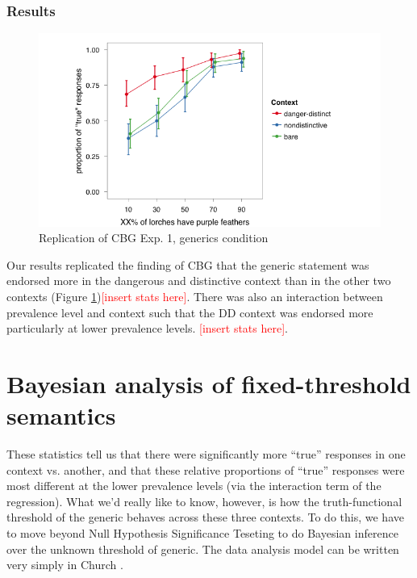 \documentclass[10pt,letterpaper]{article}
\newcommand{\red}[1]{\textcolor{Red}{#1}}
\begin{document}
\subsubsection{Results}

\begin{figure}
\centering
    \includegraphics[width=\columnwidth]{fig1_replication}
    \caption{Replication of CBG Exp. 1, generics condition}
  \label{fig:replication}
\end{figure}


Our results replicated the finding of CBG that the generic statement was endorsed more in the dangerous and distinctive context than in the other two contexts (Figure \ref{fig:replication})\red{[insert stats here]}. There was also an interaction between prevalence level and context such that the DD context was endorsed more particularly at lower prevalence levels. \red{[insert stats here]}. 

\section{Bayesian analysis of fixed-threshold semantics}

These statistics tell us that there were significantly more ``true'' responses in one context vs. another, and that these relative proportions of ``true'' responses were most different at the lower prevalence levels (via the interaction term of the regression). What we'd really like to know, however, is how the truth-functional threshold of the generic behaves across these three contexts. To do this, we have to move beyond Null Hypothesis Significance Teseting to do Bayesian inference over the unknown threshold of generic. The data analysis model can be written very simply in Church \cite{probmods}.
\end{document}

